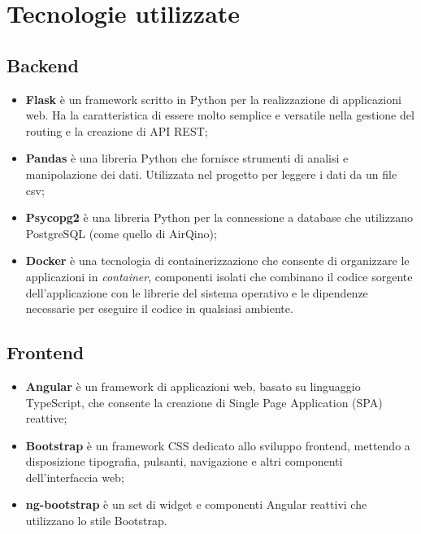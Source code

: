 \section{Tecnologie utilizzate}\label{sec:tecnologie}

\subsection{Backend}\label{ssec:interfaccia-backend}

\begin{itemize}
  \item \textbf{Flask} \cite{flask} è un framework scritto in Python per la realizzazione di applicazioni web. Ha la caratteristica di essere molto semplice e versatile nella gestione del routing e la creazione di API REST;
  \item \textbf{Pandas} \cite{pandas} è una libreria Python che fornisce strumenti di analisi e manipolazione dei dati. Utilizzata nel progetto per leggere i dati da un file csv;
  \item \textbf{Psycopg2} \cite{psycopg2} è una libreria Python per la connessione a database che utilizzano PostgreSQL (come quello di AirQino);
  \item \textbf{Docker} \cite{docker} è una tecnologia di containerizzazione che consente di organizzare le applicazioni in \textit{container}, componenti isolati che combinano il codice sorgente dell'applicazione con le librerie del sistema operativo e le dipendenze necessarie per eseguire il codice in qualsiasi ambiente. 
\end{itemize}

\subsection{Frontend}\label{ssec:interfaccia-frontend}

\begin{itemize}
  \item \textbf{Angular} \cite{angular} è un framework di applicazioni web, basato su linguaggio TypeScript, che consente la creazione di Single Page Application (SPA) reattive;
  \item \textbf{Bootstrap} \cite{bootstrap} è un framework CSS dedicato allo sviluppo frontend, mettendo a disposizione tipografia, pulsanti, navigazione e altri componenti dell'interfaccia web;
  \item \textbf{ng-bootstrap} \cite{ng-bootstrap} è un set di widget e componenti Angular reattivi che utilizzano lo stile Bootstrap.
\end{itemize}

